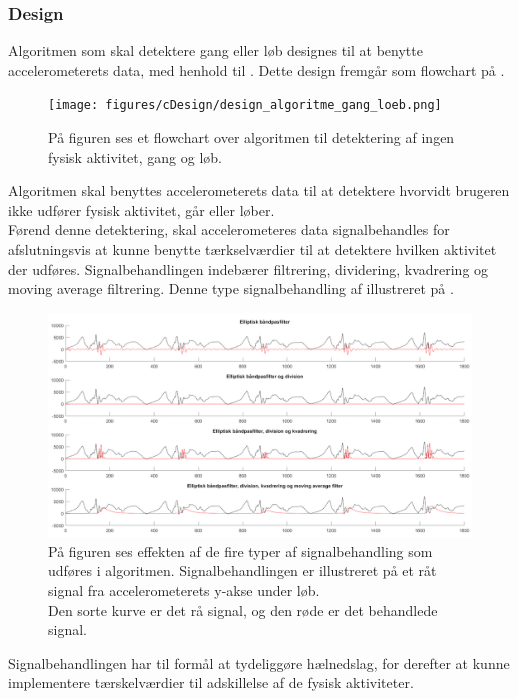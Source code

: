 \subsubsection{Design} \label{design_algo_g_l}
Algoritmen som skal detektere gang eller løb designes til at benytte accelerometerets data, med henhold til . Dette design fremgår som flowchart på .
\begin{figure}[H]
	\centering
	\texttt{[image: figures/cDesign/design\_algoritme\_gang\_loeb.png]}
	\caption{På figuren ses et flowchart over algoritmen til detektering af ingen fysisk aktivitet, gang og løb.}
	\label{fig:design_algoritme_gang_loeb}
\end{figure}
Algoritmen skal benyttes accelerometerets data til at detektere hvorvidt brugeren ikke udfører fysisk aktivitet, går eller løber. \\
Førend denne detektering, skal accelerometeres data signalbehandles for afslutningsvis at kunne benytte tærkselværdier til at detektere hvilken aktivitet der udføres. Signalbehandlingen indebærer filtrering, dividering, kvadrering og moving average filtrering. Denne type signalbehandling af illustreret på .
\begin{figure}[H]
	\centering
	\includegraphics[width=1\textwidth]{figures/cDesign/signalbehandling_psoc.png}
	\caption{På figuren ses effekten af de fire typer af signalbehandling som udføres i algoritmen. Signalbehandlingen er illustreret på et råt signal fra accelerometerets y-akse under løb. \\
Den sorte kurve er det rå signal, og den røde er det behandlede signal.}
	\label{fig:algoritme_behandling}
\end{figure}
Signalbehandlingen har til formål at tydeliggøre hælnedslag, for derefter at kunne implementere tærskelværdier til adskillelse af de fysisk aktiviteter. \\

